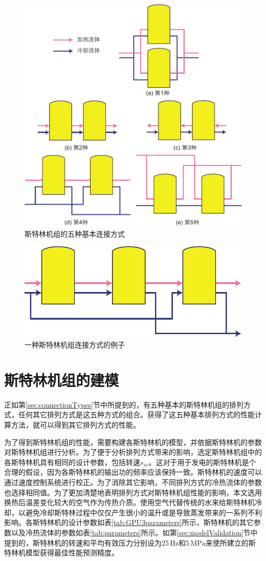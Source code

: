 \noindent \begin{figure}[htbp]
\begin{center}
	\includegraphics[width = 0.7\columnwidth]{fig/BasicSEA}
	\caption{斯特林机组的五种基本连接方式}
	\label{fig:SEA}
\end{center}
\end{figure}

\noindent \begin{figure}[htbp]
\begin{center}
	\includegraphics[width = 0.5\columnwidth]{fig/SEA_eg}
	\caption{一种斯特林机组连接方式的例子}
	\label{fig:SEA_eg}
\end{center}
\end{figure}

\section{斯特林机组的建模}

正如第\ref{sec:connectionTypes}节中所提到的，有五种基本的斯特林机组的排列方式，任何其它排列方式是这五种方式的组合。获得了这五种基本排列方式的性能计算方法，就可以得到其它排列方式的性能。

为了得到斯特林机组的性能，需要构建各斯特林机的模型，并依据斯特林机的参数对斯特林机组进行分析。为了便于分析排列方式带来的影响，选定斯特林机组中的各斯特林机具有相同的设计参数，包括转速$s_{se}$。这对于用于发电的斯特林机是个合理的假设，因为各斯特林机的输出功的频率应该保持一致。斯特林机的速度可以通过速度控制系统进行校正\cite{Hooshang2016}。为了消除其它影响，不同排列方式的冷热流体的参数也选择相同值。为了更加清楚地表明排列方式对斯特林机组性能的影响，本文选用换热后温差变化较大的空气作为传热介质。使用空气代替传统的水来给斯特林机冷却，以避免冷却斯特林过程中仅仅产生很小的温升或是导致蒸发带来的一系列不利影响。各斯特林机的设计参数如表\ref{tab:GPU3parameters}所示，斯特林机的其它参数以及冷热流体的参数如表\ref{tab:parameters}所示。如第\ref{sec:modelValidation}节中提到的，斯特林机的转速和平均有效压力分别设为25$\,\mathrm{Hz}$和5$\,\mathrm{MPa}$来使所建立的斯特林机模型获得最佳性能预测精度。

